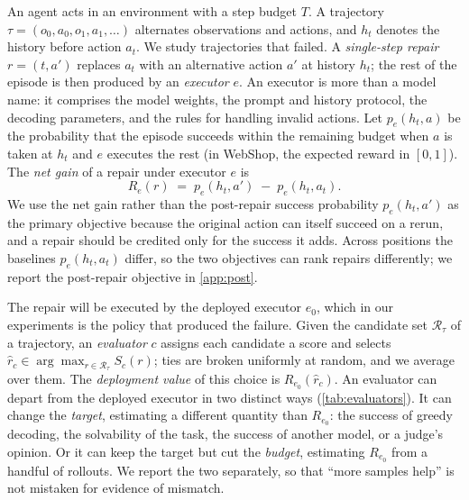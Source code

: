 \documentclass{article}
\theoremstyle{plain}
\theoremstyle{definition}
\theoremstyle{remark}
\begin{document}
An agent acts in an environment with a step budget $T$. A trajectory $\tau=(o_0,a_0,o_1,a_1,\dots)$ alternates observations and actions, and $h_t$ denotes the history before action $a_t$. We study trajectories that failed. A \emph{single-step repair} $r=(t,a')$ replaces $a_t$ with an alternative action $a'$ at history $h_t$; the rest of the episode is then produced by an \emph{executor} $e$. An executor is more than a model name: it comprises the model weights, the prompt and history protocol, the decoding parameters, and the rules for handling invalid actions. Let $p_e(h_t,a)$ be the probability that the episode succeeds within the remaining budget when $a$ is taken at $h_t$ and $e$ executes the rest (in WebShop, the expected reward in $[0,1]$). The \emph{net gain} of a repair under executor $e$ is
\begin{equation}
  R_e(r) \;=\; p_e(h_t,a') \;-\; p_e(h_t,a_t).
  \label{eq:netgain}
\end{equation}
We use the net gain rather than the post-repair success probability $p_e(h_t,a')$ as the primary objective because the original action can itself succeed on a rerun, and a repair should be credited only for the success it adds. Across positions the baselines $p_e(h_t,a_t)$ differ, so the two objectives can rank repairs differently; we report the post-repair objective in \cref{app:post}.


The repair will be executed by the deployed executor $e_0$, which in our experiments is the policy that produced the failure. Given the candidate set $\mathcal{R}_\tau$ of a trajectory, an \emph{evaluator} $c$ assigns each candidate a score and selects $\hat r_c\in\arg\max_{r\in\mathcal{R}_\tau} S_c(r)$; ties are broken uniformly at random, and we average over them. The \emph{deployment value} of this choice is $R_{e_0}(\hat r_c)$. An evaluator can depart from the deployed executor in two distinct ways (\cref{tab:evaluators}). It can change the \emph{target}, estimating a different quantity than $R_{e_0}$: the success of greedy decoding, the solvability of the task, the success of another model, or a judge's opinion. Or it can keep the target but cut the \emph{budget}, estimating $R_{e_0}$ from a handful of rollouts. We report the two separately, so that ``more samples help'' is not mistaken for evidence of mismatch.
\end{document}
